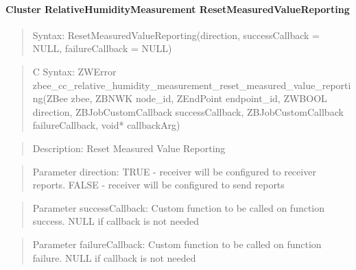 \paragraph{Cluster RelativeHumidityMeasurement ResetMeasuredValueReporting}
\begin{quote}Syntax: ResetMeasuredValueReporting(direction, successCallback = NULL, failureCallback = NULL)\end{quote}
\begin{quote}C Syntax: ZWError zbee\_cc\_relative\_humidity\_measurement\_reset\_measured\_value\_reporting(ZBee zbee, ZBNWK node\_id, ZEndPoint endpoint\_id, ZWBOOL direction, ZBJobCustomCallback successCallback, ZBJobCustomCallback failureCallback, void* callbackArg)\end{quote}
\begin{quote}Description: Reset Measured Value Reporting\end{quote}
\begin{quote}Parameter direction: TRUE  - receiver will be configured to receiver reports. FALSE - receiver will be configured to send reports\end{quote}
\begin{quote}Parameter successCallback: Custom function to be called on function success. NULL if callback is not needed\end{quote}
\begin{quote}Parameter failureCallback: Custom function to be called on function failure. NULL if callback is not needed\end{quote}



